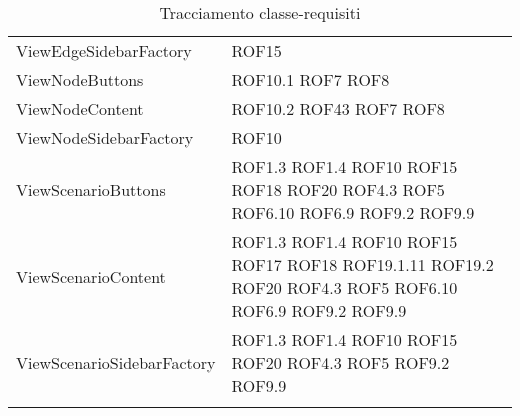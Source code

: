 \begin{longtable}{p{5cm}!{\VRule[1pt]}p{2.5cm}}
		ViewEdgeSidebarFactory & ROF15\\
		ViewNodeButtons & ROF10.1 \newline ROF7 \newline ROF8\\
		ViewNodeContent & ROF10.2 \newline ROF43 \newline ROF7 \newline ROF8\\
		ViewNodeSidebarFactory & ROF10\\
		ViewScenarioButtons & ROF1.3 \newline ROF1.4 \newline ROF10 \newline ROF15 \newline ROF18 \newline ROF20 \newline ROF4.3 \newline ROF5 \newline ROF6.10 \newline ROF6.9 \newline ROF9.2 \newline ROF9.9\\
		ViewScenarioContent & ROF1.3 \newline ROF1.4 \newline ROF10 \newline ROF15 \newline ROF17 \newline ROF18 \newline ROF19.1.11 \newline ROF19.2 \newline ROF20 \newline ROF4.3 \newline ROF5 \newline ROF6.10 \newline ROF6.9 \newline ROF9.2 \newline ROF9.9\\
		ViewScenarioSidebarFactory & ROF1.3 \newline ROF1.4 \newline ROF10 \newline ROF15 \newline ROF20 \newline ROF4.3 \newline ROF5 \newline ROF9.2 \newline ROF9.9\\
		\caption{Tracciamento classe-requisiti}
	\end{longtable}
	
